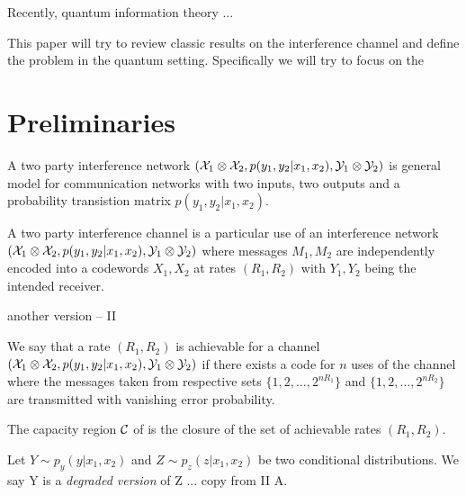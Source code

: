 \documentclass[aps,11pt,twoside,letterpaper]{article}
\theoremstyle{plain}
\theoremstyle{definition}
\begin{document}
    Recently, quantum information theory ...
    
    This paper will try to review classic results on the interference channel and
    define the problem in the quantum setting.
    Specifically we will try to focus on the 
    
    
    
    
 \section{Preliminaries}

	
        \begin{definition}
            A two party interference network $({\cal X}_1 \otimes {\cal X}_2, p(y_1,y_2|x_1,x_2), {\cal Y}_1 \otimes {\cal Y}_2)$ 
            is general model for communication networks with two inputs, two outputs and a probability transistion
            matrix $p(y_1,y_2|x_1,x_2)$.
        \end{definition}
        
        

        \begin{definition}
            A two party interference channel is a particular use of an interference network 
            $({\cal X}_1 \otimes {\cal X}_2, p(y_1,y_2|x_1,x_2), {\cal Y}_1 \otimes {\cal Y}_2)$ 
            where messages $M_1,M_2$ are independently encoded into a codewords $X_1,X_2$ 
            at rates $(R_1,R_2)$ with $Y_1,Y_2$ being the intended receiver.
        \end{definition}

        another version -- II

        
        \begin{definition}
            We say that a rate $(R_1,R_2)$ is achievable for a channel $({\cal X}_1 \otimes {\cal X}_2, p(y_1,y_2|x_1,x_2), {\cal Y}_1 \otimes {\cal Y}_2)$
            if there exists a code for $n$ uses of the channel where the messages taken from respective sets $\{1,2,\ldots,2^{nR_1} \}$ and
             $\{1,2,\ldots,2^{nR_2} \}$ are transmitted with vanishing error probability.
        \end{definition}
        
        
        \begin{definition}[Capacity]
            The capacity region ${\cal C}$ of is the closure of the set of achievable rates $(R_1,R_2)$.
        \end{definition}


        \begin{definition}
            Let $Y \sim p_y(y|x_1,x_2)$ and $Z \sim p_z(z|x_1,x_2)$ be two conditional distributions.
            We say Y is a \emph{degraded version} of Z ...
            copy from \cite{Carleial83} II A.
        \end{definition}
\end{document}
